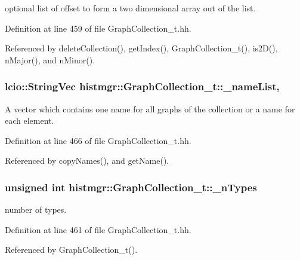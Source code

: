 optional list of offset to form a two dimensional array out of the list. 



Definition at line 459 of file Graph\-Collection\-\_\-t.\-hh.



Referenced by delete\-Collection(), get\-Index(), Graph\-Collection\-\_\-t(), is2\-D(), n\-Major(), and n\-Minor().

\subsubsection[{\-\_\-name\-List}]{\setlength{\rightskip}{0pt plus 5cm}lcio\-::\-String\-Vec histmgr\-::\-Graph\-Collection\-\_\-t\-::\-\_\-name\-List\hspace{0.3cm}{\ttfamily [mutable]}, {\ttfamily [private]}}\label{classhistmgr_1_1GraphCollection__t_a49f968e20a9fa50f9d0d828c61d36028}


A vector which contains one name for all graphs of the collection or a name for each element. 



Definition at line 466 of file Graph\-Collection\-\_\-t.\-hh.



Referenced by copy\-Names(), and get\-Name().

\subsubsection[{\-\_\-n\-Types}]{\setlength{\rightskip}{0pt plus 5cm}unsigned int histmgr\-::\-Graph\-Collection\-\_\-t\-::\-\_\-n\-Types\hspace{0.3cm}{\ttfamily [private]}}\label{classhistmgr_1_1GraphCollection__t_ab1a67d796536013057dc680c9f215f36}


number of types. 



Definition at line 461 of file Graph\-Collection\-\_\-t.\-hh.



Referenced by Graph\-Collection\-\_\-t().

